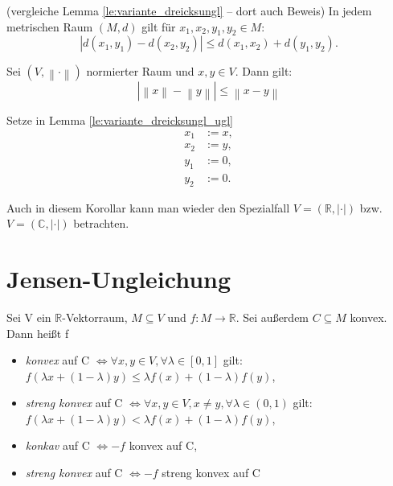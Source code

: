 \documentclass[10pt]{scrbook}
\begin{document}
\begin{Le}
\label{le:variante_dreicksungl_ugl}
(vergleiche Lemma \ref{le:variante_dreicksungl} -- dort auch Beweis)
In jedem metrischen Raum $(M, d)$ gilt für $x_1, x_2, y_1, y_2\in M$:
\begin{equation}
	\left|d(x_1, y_1)-d(x_2, y_2)\right|\leq d(x_1, x_2)+d(y_1, y_2).
\end{equation}
\end{Le}

\begin{Kor}
Sei $(V, \left\|\cdot\right\|)$ normierter Raum und $x, y\in V$. Dann gilt:
\begin{equation}
\left|\left\|x\right\|-\left\|y\right\|\right| \leq \left\|x-y\right\|
\end{equation}
\end{Kor}
\begin{bew}
Setze in Lemma \ref{le:variante_dreicksungl_ugl}
\begin{align*}
x_1 & := x, \\
x_2 & := y, \\
y_1 & := 0, \\
y_2 & := 0.
\end{align*}
\end{bew}

Auch in diesem Korollar kann man wieder den Spezialfall $V=(\mathbb{R}, \left|\cdot\right|)$ bzw. $V=(\mathbb{C}, \left|\cdot\right|)$ betrachten.

\section{Jensen-Ungleichung}

\begin{Def}
\label{def:konvexe_fkt}
Sei V ein $\mathbb{R}$-Vektorraum, $M\subseteq V$ und $f: M\rightarrow \mathbb{R}$. Sei außerdem $C\subseteq M$ konvex. Dann heißt f
\begin{itemize}
\item \emph{konvex} auf C $\Leftrightarrow \forall x, y\in V, \forall \lambda \in\left[0, 1\right]$ gilt: $f(\lambda x+\left(1-\lambda\right) y) \leq \lambda f(x)+\left(1-\lambda\right) f(y)$,
\item \emph{streng konvex} auf C $\Leftrightarrow \forall x, y\in V, x\neq y, \forall \lambda \in\left(0, 1\right)$ gilt: $f(\lambda x+\left(1-\lambda\right) y) < \lambda f(x)+\left(1-\lambda\right) f(y)$,
\item \emph{konkav} auf C $\Leftrightarrow -f$ konvex auf C,
\item \emph{streng konvex} auf C $\Leftrightarrow -f$ streng konvex auf C
\end{itemize}
\end{Def}
\end{document}
